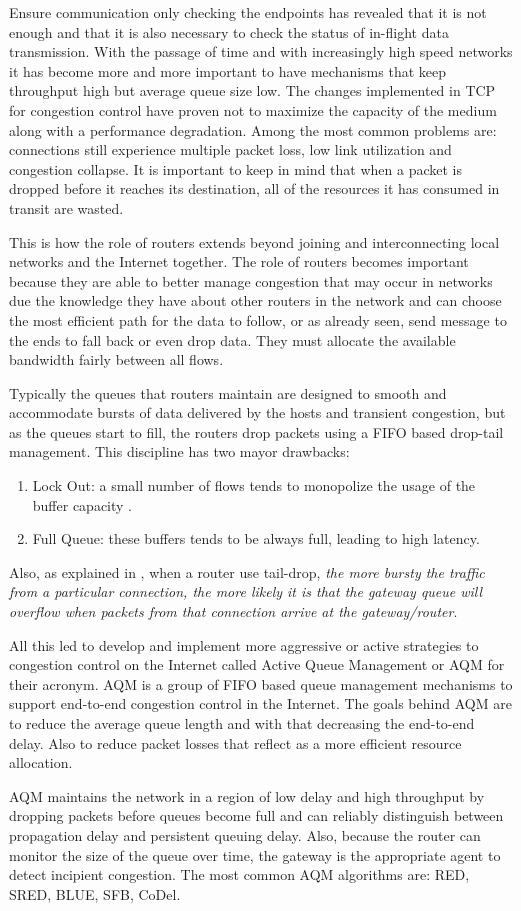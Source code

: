Ensure communication only checking the endpoints has revealed that it is not
enough and that it is also necessary to check the status of in-flight data
transmission. With the passage of time and with increasingly high speed
networks it has become more and more important to have mechanisms that keep
throughput high but average queue size low. The changes implemented in TCP for
congestion control have proven not to maximize the capacity of the medium
along with a performance degradation. Among the most common problems are:
connections still experience multiple packet loss, low link utilization and
congestion collapse. It is important to keep in mind that when a packet is
dropped before it reaches its destination, all of the resources it has
consumed in transit are wasted.

This is how the role of routers extends beyond joining and interconnecting local
networks and the Internet together. The role of routers becomes important
because they are able to better manage congestion that may occur in networks
due the knowledge they have about other routers in the network and can choose
the most efficient path for the data to follow, or as already seen, send
message to the ends to fall back or even drop data.  They must allocate
the available bandwidth fairly between all flows.

Typically the queues that routers maintain are designed to smooth and
accommodate bursts of data delivered by the hosts and transient congestion,
but as the queues start to fill, the routers drop packets using a FIFO based
drop-tail management. This discipline has two mayor drawbacks:
\begin{enumerate}
\item Lock Out: a small number of flows tends to monopolize the usage of the
buffer capacity\cite{evolvshortlongflows} .
\item Full Queue: these buffers tends to be always full, leading to 
high latency.
\end{enumerate}

Also, as explained in \cite{FloydJacobsonRED}, when a router use tail-drop,
\textit{the more bursty the traffic from a particular connection, the more
likely it is that the gateway queue will overflow when packets from that
connection arrive at the gateway/router}.

All this led to develop and implement more aggressive or active strategies to
congestion control on the Internet called Active Queue Management or AQM for
their acronym. AQM is a group of FIFO based queue management mechanisms to
support end-to-end congestion control in the Internet. The goals behind AQM
are to reduce the average queue length and with that decreasing the end-to-end
delay. Also to reduce packet losses that reflect as a more efficient resource
allocation.

AQM maintains the network in a region of low delay and high throughput by
dropping packets before queues become full and can reliably distinguish
between propagation delay and persistent queuing delay. Also, because the
router can monitor the size of the queue over time, the gateway is the
appropriate agent to detect incipient congestion. The most common AQM
algorithms are: RED, SRED, BLUE, SFB, CoDel.
